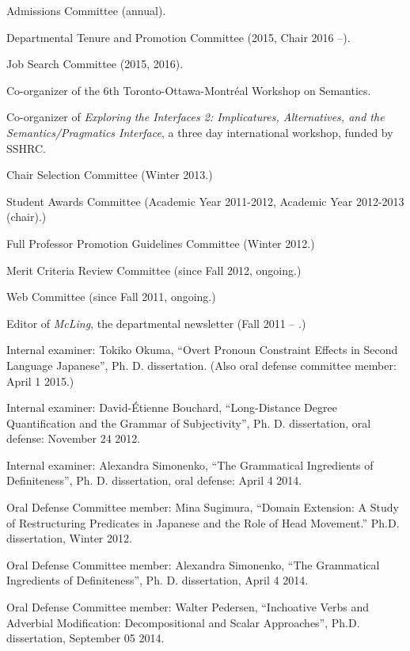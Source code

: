 \documentclass[11pt]{article}
\begin{document}
Admissions Committee (annual).

Departmental Tenure and Promotion Committee (2015, Chair 2016 --).

Job Search Committee (2015, 2016).

Co-organizer of the 6th Toronto-Ottawa-Montr\'eal Workshop on
Semantics.

Co-organizer of \textit{Exploring the Interfaces 2: Implicatures,
  Alternatives, and the Semantics/Pragmatics Interface}, a three day
international workshop, funded by SSHRC.

Chair Selection Committee (Winter 2013.)


Student Awards Committee (Academic Year 2011-2012, Academic Year
2012-2013 (chair).)


Full Professor Promotion Guidelines Committee (Winter 2012.)


Merit Criteria Review Committee (since Fall 2012, ongoing.)

Web Committee  (since Fall 2011, ongoing.)

Editor of \textit{McLing}, the departmental newsletter (Fall 2011 --
.)

Internal examiner:  Tokiko Okuma, ``Overt Pronoun Constraint Effects in Second Language Japanese'', Ph. D. dissertation. (Also oral defense committee member: April 1 2015.)

Internal examiner:  David-\'Etienne Bouchard, ``Long-Distance Degree Quantification and the
Grammar of Subjectivity'', Ph. D. dissertation, oral defense: November
24 2012.

Internal examiner:  Alexandra Simonenko, ``The Grammatical Ingredients
of Definiteness'', Ph. D. dissertation, oral defense: April 4 2014.

Oral Defense Committee member: Mina Sugimura, ``Domain Extension:  A Study of Restructuring
Predicates in Japanese and the Role of Head Movement.''
Ph.D. dissertation, Winter 2012. 

Oral Defense Committee member:   Alexandra Simonenko, ``The Grammatical Ingredients
of Definiteness'', Ph. D. dissertation, April 4 2014.

Oral Defense Committee member:  Walter Pedersen, ``Inchoative Verbs and Adverbial Modification: Decompositional and Scalar Approaches'', Ph.D. dissertation, September 05 2014.
\end{document}
